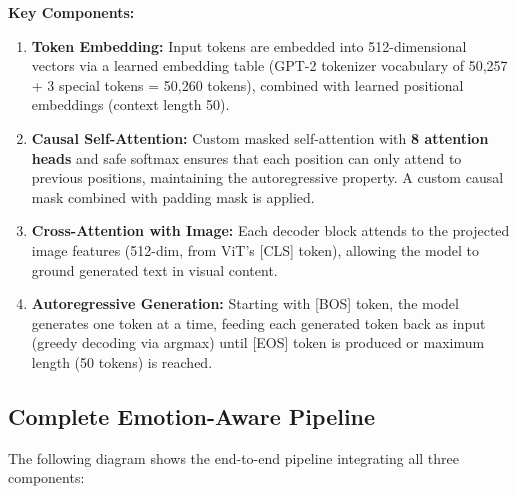 \documentclass[12pt]{article}
\begin{document}
\textbf{Key Components:}

\begin{enumerate}
\item \textbf{Token Embedding:} Input tokens are embedded into 512-dimensional vectors via a learned embedding table (GPT-2 tokenizer vocabulary of 50,257 + 3 special tokens = 50,260 tokens), combined with learned positional embeddings (context length 50).

\item \textbf{Causal Self-Attention:} Custom masked self-attention with \textbf{8 attention heads} and safe softmax ensures that each position can only attend to previous positions, maintaining the autoregressive property. A custom causal mask combined with padding mask is applied.

\item \textbf{Cross-Attention with Image:} Each decoder block attends to the projected image features (512-dim, from ViT's [CLS] token), allowing the model to ground generated text in visual content.

\item \textbf{Autoregressive Generation:} Starting with [BOS] token, the model generates one token at a time, feeding each generated token back as input (greedy decoding via argmax) until [EOS] token is produced or maximum length (50 tokens) is reached.
\end{enumerate}

\subsection{Complete Emotion-Aware Pipeline}

The following diagram shows the end-to-end pipeline integrating all three components:
\end{document}
